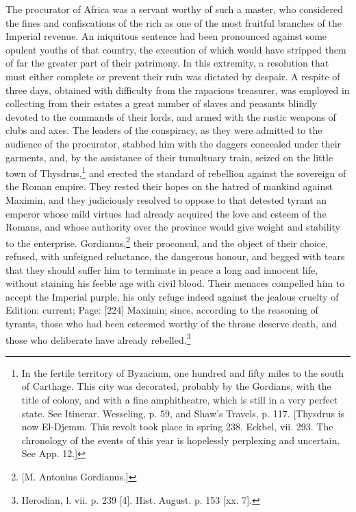 The procurator of Africa was a servant worthy of such a master, who considered the fines and confiscations of the rich as one of the most fruitful branches of the Imperial revenue. An iniquitous sentence had been pronounced against some opulent youths of that country, the execution of which would have stripped them of far the greater part of their patrimony. In this extremity, a resolution that must either complete or prevent their ruin was dictated by despair. A respite of three days, obtained with difficulty from the rapacious treasurer, was employed in collecting from their estates a great number of slaves and peasants blindly devoted to the commands of their lords, and armed with the rustic weapons of clubs and axes. The leaders of the conspiracy, as they were admitted to the audience of the procurator, stabbed him with the daggers concealed under their garments, and, by the assistance of their tumultuary train, seized on the little town of Thysdrus,\footnote{In the fertile territory of Byzacium, one hundred and fifty miles to the south of Carthage. This city was decorated, probably by the Gordians, with the title of colony, and with a fine amphitheatre, which is still in a very perfect state. See Itinerar. Wesseling, p. 59, and Shaw\texthebrew{}’s Travels, p. 117. [Thysdrus is now El-Djemm. This revolt took place in spring 238. Eckbel, vii. 293. The chronology of the events of this year is hopelessly perplexing and uncertain. See App. 12.]} and erected the standard of rebellion against the sovereign of the Roman empire. They rested their hopes on the hatred of mankind against Maximin, and they judiciously resolved to oppose to that detested tyrant an emperor whose mild virtues had already acquired the love and esteem of the Romans, and whose authority over the province would give weight and stability to the enterprise. Gordianus,\footnote{[M. Antonius Gordianus.]} their proconsul, and the object of their choice, refused, with unfeigned reluctance, the dangerous honour, and begged with tears that they should suffer him to terminate in peace a long and innocent life, without staining his feeble age with civil blood. Their menaces compelled him to accept the Imperial purple, his only refuge indeed against the jealous cruelty of Edition: current; Page: [224] Maximin; since, according to the reasoning of tyrants, those who had been esteemed worthy of the throne deserve death, and those who deliberate have already rebelled.\footnote{Herodian, l. vii. p. 239 [4]. Hist. August. p. 153 [xx. 7].}

